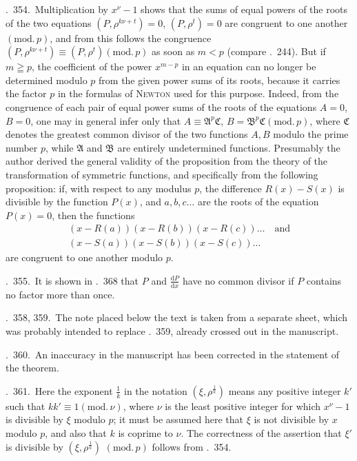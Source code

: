 \textsection.\ 354.\ Multiplication by $x^\nu-1$ shows that the sums of equal powers of the roots of the two equations $(P,\rho^{k\nu+t})=0$, $(P,\rho^t)=0$ are congruent to one another $(\mathrm{mod.}\,p)$, and from this follows the congruence $(P,\rho^{k\nu+t})\equiv(P,\rho^t)(\mathrm{mod.}\,p)$ as soon as $m<p$ (compare \textsection.\ 244). But if $m\geqq p$, the coefficient of the power $x^{m-p}$ in an equation can no longer be determined modulo $p$ from the given power sums of its roots, because it carries the factor $p$ in the formulas of \textsc{Newton} used for this purpose. Indeed, from the congruence of each pair of equal power sums of the roots of the equations $A=0$, $B=0$, one may in general infer only that $A\equiv\mathfrak A^p\mathfrak C$, $B=\mathfrak B^p\mathfrak C(\mathrm{mod.}\,p)$, where $\mathfrak C$ denotes the greatest common divisor of the two functions $A,B$ modulo the prime number $p$, while $\mathfrak A$ and $\mathfrak B$ are entirely undetermined functions. Presumably the author derived the general validity of the proposition from the theory of the transformation of symmetric functions, and specifically from the following proposition: if, with respect to any modulus $p$, the difference $R(x)-S(x)$ is divisible by the function $P(x)$, and $a,b,c\ldots$ are the roots of the equation $P(x)=0$, then the functions
\[
\begin{gathered}
(x-R(a))(x-R(b))(x-R(c))\ldots\quad\text{and}\\
(x-S(a))(x-S(b))(x-S(c))\ldots
\end{gathered}
\]
are congruent to one another modulo $p$.

\textsection.\ 355.\ It is shown in \textsection.\ 368 that $P$ and $\frac{\mathrm{d}P}{\mathrm{d}x}$ have no common divisor if $P$ contains no factor more than once.

\textsection\textsection.\ 358, 359.\ The note placed below the text is taken from a separate sheet, which was probably intended to replace \textsection.\ 359, already crossed out in the manuscript.

\textsection.\ 360.\ An inaccuracy in the manuscript has been corrected in the statement of the theorem.

\textsection.\ 361.\ Here the exponent $\frac1k$ in the notation $(\xi,\rho^{\frac1k})$ means any positive integer $k'$ such that $kk'\equiv1(\mathrm{mod.}\,\nu)$, where $\nu$ is the least positive integer for which $x^\nu-1$ is divisible by $\xi$ modulo $p$; it must be assumed here that $\xi$ is not divisible by $x$ modulo $p$, and also that $k$ is coprime to $\nu$. The correctness of the assertion that $\xi'$ is divisible by $(\xi,\rho^{\frac1k})$ $(\mathrm{mod.}\,p)$ follows from \textsection.\ 354.

